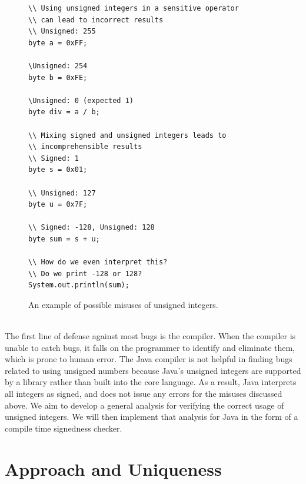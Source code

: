 \begin{figure}[t]
\begin{lstlisting}
\\ Using unsigned integers in a sensitive operator
\\ can lead to incorrect results
\\ Unsigned: 255
byte a = 0xFF;

\Unsigned: 254
byte b = 0xFE;

\Unsigned: 0 (expected 1)
byte div = a / b;

\\ Mixing signed and unsigned integers leads to
\\ incomprehensible results
\\ Signed: 1
byte s = 0x01;

\\ Unsigned: 127
byte u = 0x7F;

\\ Signed: -128, Unsigned: 128
byte sum = s + u;

\\ How do we even interpret this?
\\ Do we print -128 or 128?
System.out.println(sum);
\end{lstlisting}
\caption{An example of possible misuses of unsigned integers.}
\label{fig:misuse}
\end{figure}

\noindent\\
The first line of defense against most bugs is the compiler. When the
compiler is unable to catch bugs, it falls on the programmer to identify and
eliminate them, which is prone to human error. The Java compiler
is not helpful in finding bugs related to using unsigned
numbers because Java's unsigned
integers are supported by a library rather than built into the core language.
As a result, Java interprets all integers as signed, and does not issue any
errors for the misuses discussed above. We aim to develop a general analysis
for verifying the correct usage of unsigned integers. We will then implement
that analysis for Java in the form of a compile time signedness checker.

\newpage
\section{Approach and Uniqueness} \label{app}

